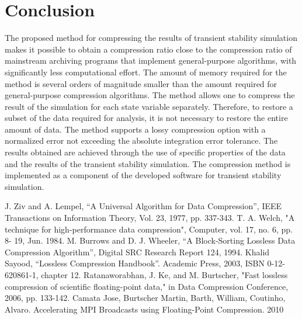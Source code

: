 \documentclass[conference]{IEEEtran}
\begin{document}
\section{Conclusion}
The proposed method for compressing the results of transient stability simulation makes it possible to obtain 
a compression ratio close to the compression ratio of mainstream archiving programs that implement general-purpose 
algorithms, with significantly less computational effort. 
The amount of memory required for the method is several orders of magnitude smaller than the amount required for 
general-purpose compression algorithms. The method allows one to compress the result of the simulation for each 
state variable separately. Therefore, to restore a subset of the data required for analysis, it is not necessary 
to restore the entire amount of data. The method supports a lossy compression option with a normalized error not 
exceeding the absolute integration error tolerance. The results obtained are achieved through the use of specific 
properties of the data and the results of the transient stability simulation. The compression method is implemented 
as a component of the developed software for transient stability simulation.

\begin{thebibliography}{00}
	
	J. Ziv and A. Lempel, “A Universal Algorithm for Data Compression”, IEEE Transactions on
	Information Theory, Vol. 23, 1977, pp. 337-343.
	T. A. Welch, "A technique for high-performance data compression", Computer, vol. 17, no. 6, pp. 8-
	19, Jun. 1984.
	M. Burrows and D. J. Wheeler, “A Block-Sorting Lossless Data Compression Algorithm”, Digital
	SRC Research Report 124, 1994.
	Khalid Sayood, “Lossless Compression Handbook”. Academic Press, 2003, ISBN 0-12-620861-1,
	chapter 12.
	Ratanaworabhan, J. Ke, and M. Burtscher, "Fast lossless compression of scientific floating-point data,"
	in Data Compression Conference, 2006, pp. 133-142.
	Camata Jose, Burtscher Martin, Barth, William, Coutinho, Alvaro. Accelerating MPI Broadcasts using Floating-Point Compression. 2010
	
\end{thebibliography}
\end{document}
